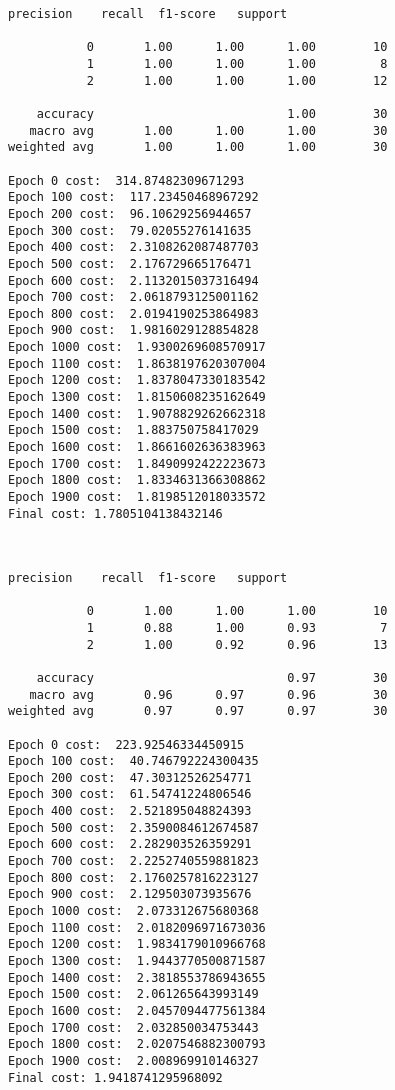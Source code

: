 \documentclass[11pt]{article}
\begin{document}
    \begin{Verbatim}[commandchars=\\\{\}]
              precision    recall  f1-score   support

           0       1.00      1.00      1.00        10
           1       1.00      1.00      1.00         8
           2       1.00      1.00      1.00        12

    accuracy                           1.00        30
   macro avg       1.00      1.00      1.00        30
weighted avg       1.00      1.00      1.00        30

Epoch 0 cost:  314.87482309671293
Epoch 100 cost:  117.23450468967292
Epoch 200 cost:  96.10629256944657
Epoch 300 cost:  79.02055276141635
Epoch 400 cost:  2.3108262087487703
Epoch 500 cost:  2.176729665176471
Epoch 600 cost:  2.1132015037316494
Epoch 700 cost:  2.0618793125001162
Epoch 800 cost:  2.0194190253864983
Epoch 900 cost:  1.9816029128854828
Epoch 1000 cost:  1.9300269608570917
Epoch 1100 cost:  1.8638197620307004
Epoch 1200 cost:  1.8378047330183542
Epoch 1300 cost:  1.8150608235162649
Epoch 1400 cost:  1.9078829262662318
Epoch 1500 cost:  1.883750758417029
Epoch 1600 cost:  1.8661602636383963
Epoch 1700 cost:  1.8490992422223673
Epoch 1800 cost:  1.8334631366308862
Epoch 1900 cost:  1.8198512018033572
Final cost: 1.7805104138432146

    \end{Verbatim}

    \begin{center}
    \end{center}
    { \hspace*{\fill} \\}
    
    \begin{Verbatim}[commandchars=\\\{\}]
              precision    recall  f1-score   support

           0       1.00      1.00      1.00        10
           1       0.88      1.00      0.93         7
           2       1.00      0.92      0.96        13

    accuracy                           0.97        30
   macro avg       0.96      0.97      0.96        30
weighted avg       0.97      0.97      0.97        30

Epoch 0 cost:  223.92546334450915
Epoch 100 cost:  40.746792224300435
Epoch 200 cost:  47.30312526254771
Epoch 300 cost:  61.54741224806546
Epoch 400 cost:  2.521895048824393
Epoch 500 cost:  2.3590084612674587
Epoch 600 cost:  2.282903526359291
Epoch 700 cost:  2.2252740559881823
Epoch 800 cost:  2.1760257816223127
Epoch 900 cost:  2.129503073935676
Epoch 1000 cost:  2.073312675680368
Epoch 1100 cost:  2.0182096971673036
Epoch 1200 cost:  1.9834179010966768
Epoch 1300 cost:  1.9443770500871587
Epoch 1400 cost:  2.3818553786943655
Epoch 1500 cost:  2.061265643993149
Epoch 1600 cost:  2.0457094477561384
Epoch 1700 cost:  2.032850034753443
Epoch 1800 cost:  2.0207546882300793
Epoch 1900 cost:  2.008969910146327
Final cost: 1.9418741295968092

    \end{Verbatim}
\end{document}
